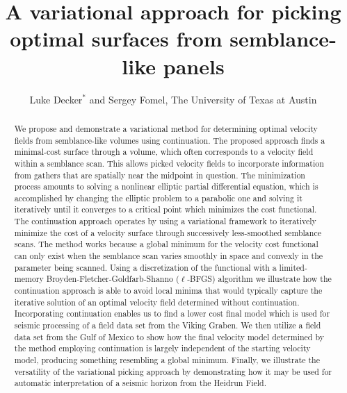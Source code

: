 \title{A variational approach for picking optimal surfaces from semblance-like panels}
\newtheorem{definition}{Definition}[section]
\author{Luke Decker$^*$ and Sergey Fomel, The University of Texas at Austin}
\address{
Oden Institute for Computational Engineering and Sciences \\
The University of Texas at Austin \\
201 E 24th St, \\
Austin, TX 78712 \\
decker.luke@utexas.edu
}
\maketitle

\begin{abstract}

We propose and demonstrate a variational method for determining optimal velocity fields from semblance-like volumes using continuation. The proposed approach finds a minimal-cost surface through a volume, which often corresponds to a velocity field within a semblance scan.  This allows picked velocity fields to incorporate information from gathers that are spatially near the midpoint in question.  The minimization process amounts to solving a nonlinear elliptic partial differential equation, which is accomplished by changing the elliptic problem to a parabolic one and solving it iteratively until it converges to a critical point which minimizes the cost functional. The continuation approach operates by using a variational framework to iteratively minimize the cost of a velocity surface through successively less-smoothed semblance scans.  The method works because a global minimum for the velocity cost functional can only exist when the semblance scan varies smoothly in space and convexly in the parameter being scanned.  Using a discretization of the functional with a limited-memory Broyden-Fletcher-Goldfarb-Shanno ($\ell$-BFGS) algorithm we illustrate how the continuation approach is able to avoid local minima that would typically capture the iterative solution of an optimal velocity field determined without continuation.  Incorporating continuation enables us to find a lower cost final model which is used for seismic processing of a field data set from the Viking Graben.  We then utilize a field data set from the Gulf of Mexico to show how the final velocity model determined by the method employing continuation is largely independent of the starting velocity model, producing something resembling a global minimum.  Finally, we illustrate the versatility of the variational picking approach by demonstrating how it may be used for automatic interpretation of a seismic horizon from the Heidrun Field.
\end{abstract}

